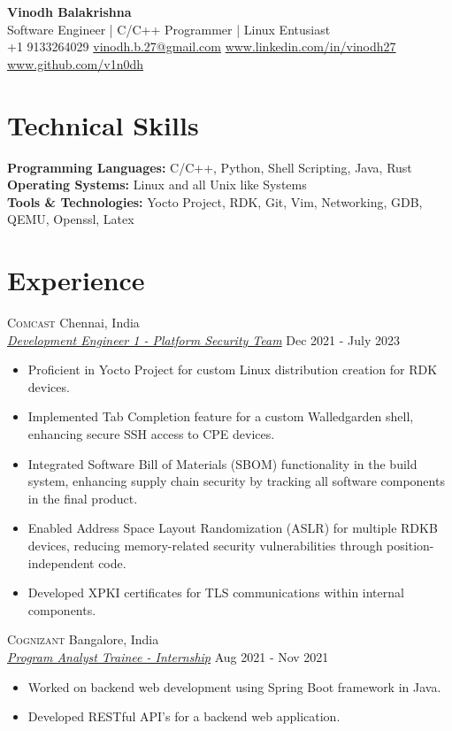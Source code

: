 \documentclass[10pt, letterpaper]{article}
\renewcommand{\maketitle}[6]{
	\begin{center}
	\Large{\textbf{#1}} \\
	\vspace*{0.25em}
	\normalsize {#2} \\
	\vspace*{0.25em}
	\faPhoneSquare \hspace{0.1em} {#3} \hspace*{0.5em}
	\faEnvelope \hspace{0.1em} \href{mailto:#4}{#4} \hspace*{0.5em}
	\faLinkedinSquare \hspace{0.1em} \href{https://#5}{#5} \hspace{0.5em}
	\faGithubSquare \hspace{0.1em} \href{https://#6}{#6}
	\end{center}
}
\newcommand{\cmpnysection}[4] {
	\raggedright{\large\scshape{#1}}
	\hfill {#2} \\
	\underline{\textit{#3}}
	\hfill {#4}
}
\begin{document}
\maketitle
{Vinodh Balakrishna}
{Software Engineer | C/C++ Programmer | Linux Entusiast}
{+1 9133264029}
{vinodh.b.27@gmail.com}
{www.linkedin.com/in/vinodh27}
{www.github.com/v1n0dh}

\thispagestyle{empty}

\section{Technical Skills}
\textbf{Programming Languages: }C/C++, Python, Shell Scripting, Java, Rust \\
\textbf{Operating Systems: }Linux and all Unix like Systems \\
\textbf{Tools \& Technologies: }Yocto Project, RDK, Git, Vim, Networking, GDB, QEMU, Openssl, Latex

\section{Experience}
\cmpnysection
{Comcast}
{Chennai, India}
{Development Engineer 1 - Platform Security Team}
{Dec 2021 - July 2023}
\begin{itemize}[leftmargin=6mm]
	\setlength\itemsep{0em}
	\item{Proficient in Yocto Project for custom Linux distribution creation for RDK devices.}
	\item{Implemented Tab Completion feature for a custom Walledgarden shell, enhancing secure SSH access to CPE devices.}
	\item{Integrated Software Bill of Materials (SBOM) functionality in the build system, enhancing supply chain security by tracking all software components in the final product.}
	\item{Enabled Address Space Layout Randomization (ASLR) for multiple RDKB devices, reducing memory-related security vulnerabilities through position-independent code.}
	\item{Developed XPKI certificates for TLS communications within internal components.}
\end{itemize}

\cmpnysection
{Cognizant}
{Bangalore, India}
{Program Analyst Trainee - Internship}
{Aug 2021 - Nov 2021}
\begin{itemize}[leftmargin=6mm]
	\setlength\itemsep{0em}
	\item{Worked on backend web development using Spring Boot framework in Java.}
	\item{Developed RESTful API's for a backend web application.}
\end{itemize}
\end{document}

